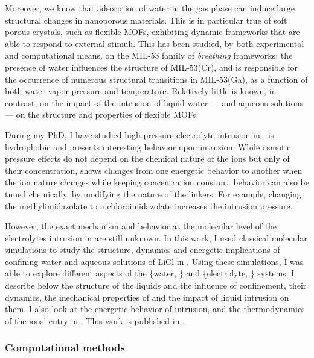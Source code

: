 \documentclass[thesis]{subfiles}
\begin{document}
Moreover, we know that adsorption of water in the gas phase can induce large
structural changes in nanoporous materials\cite{Lee2001, Seoung2013}. This is in
particular true of soft porous crystals\cite{Horike2009}, such as flexible
MOFs\cite{Schneemann2014}, exhibiting dynamic frameworks that are able to
respond to external stimuli. This has been studied, by both experimental and
computational means, on the MIL-53 family of \emph{breathing} frameworks: the
presence of water influences the structure of MIL-53(Cr)\cite{Haigis2013}, and
is responsible for the occurrence of numerous structural transitions in
MIL-53(Ga), as a function of both water vapor pressure and
temperature\cite{Boutin2013, Coudert2014}. Relatively little is known, in
contrast, on the impact of the intrusion of liquid water --- and aqueous
solutions --- on the structure and properties of flexible MOFs.

During my PhD, I have studied high-pressure electrolyte intrusion in .
 is hydrophobic\cite{AOrtiz2014} and presents interesting behavior upon
intrusion. While osmotic pressure effects do not depend on the chemical nature
of the ions but only of their concentration,  shows changes from one
energetic behavior to another when the ion nature changes while keeping
concentration constant\cite{Ortiz2014}.  behavior can also be tuned
chemically, by modifying the nature of the linkers. For example, changing the
methylimidazolate to a chloroimidazolate increases the intrusion
pressure\cite{Mortada2018}.

However, the exact mechanism and behavior at the molecular level of the
electrolytes intrusion in  are still unknown. In this work, I used
classical molecular simulations to study the structure, dynamics and energetic
implications of confining water and aqueous solutions of LiCl in . Using
these simulations, I was able to explore different aspects of the \{water,
\} and \{electrolyte, \} systems. I describe below the structure of
the liquids and the influence of confinement, their dynamics, the mechanical
properties of  and the impact of liquid intrusion on them. I also look at
the energetic behavior of intrusion, and the thermodynamics of the ions' entry
in . This work is published in \cite{Fraux2019-2}.

\subsubsection{Computational methods}
\end{document}
